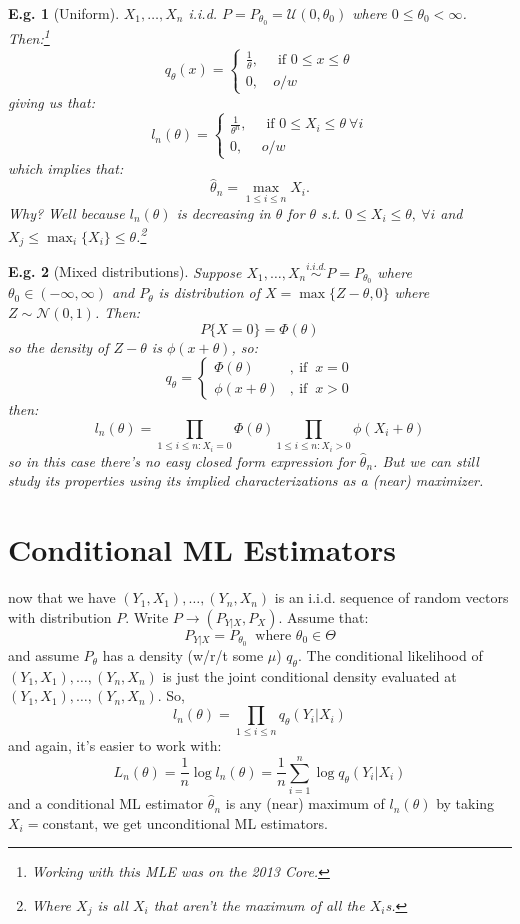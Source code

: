 \documentclass{tufte-book}
\theoremstyle{mytheoremstyle}
\theoremstyle{mylemstyle}
\theoremstyle{mydefstyle}
\newtheorem*{ex}{E.g.}
\begin{document}
\begin{ex}[Uniform] \(X_1, \dots, X_n\) i.i.d. \(P=P_{\theta_0} = \mathcal{U}(0, \theta_0)\) where \(0 \le \theta_0 < \infty\). Then:\footnote{Working with this MLE was on the 2013 Core.}
	\[q_\theta(x) = \begin{cases} \frac{1}{\theta},\ & \text{ if } 0 \le x \le \theta \\ 0,\ &o/w \end{cases} \]
giving us that:
	\[l_n(\theta) = \begin{cases} \frac{1}{\theta^n},\ & \text{ if } 0 \le X_i \le \theta\ \forall i \\ 0, & o/w \end{cases} \]
which implies that:
	\[\hat{\theta}_n = \max_{1 \le i \le n} X_i \text{.}\]
Why? Well because \(l_n(\theta)\) is decreasing in \(\theta\) for \(\theta\) s.t. \(0 \le X_i \le \theta,\ \forall i\) and \(X_j \le \max_i \{X_i\} \le \theta\).\footnote{Where \(X_j\) is all \(X_i\) that aren't the maximum of all the \(X_i\)s.}  
\end{ex}
\begin{ex}[Mixed distributions] Suppose \(X_1, \dots, X_n \overset{i.i.d.}{\sim} P=P_{\theta_0}\) where \(\theta_0 \in (-\infty, \infty)\) and \(P_\theta\) is distribution of \(X = \max\{Z-\theta, 0\}\) where \(Z \sim \mathcal{N}(0,1)\). Then:
	\[P\{X=0\} = \Phi(\theta)\]
so the density of \(Z- \theta\) is \(\phi(x+\theta)\), so:
	\[q_\theta = \begin{cases} \Phi(\theta)&,\ \text{if }\ x=0 \\ \phi(x + \theta)&,\ \text{if }\ x > 0 \end{cases}\]
then:
	\[l_n(\theta) = \prod_{1 \le i \le n: X_i = 0} \Phi(\theta) \prod_{1 \le i \le n: X_i > 0} \phi(X_i + \theta)\]
so in this case there's no easy closed form expression for \(\hat{\theta}_n\). But we can still study its properties using its implied characterizations as a (near) maximizer. 
\end{ex}

\section{Conditional ML Estimators}
 now that we have \((Y_1, X_1), \dots, (Y_n, X_n)\) is an i.i.d. sequence of random vectors with distribution \(P\). Write \(P \rightarrow (P_{Y|X}, P_X)\). Assume that:
	\[P_{Y|X} = P_{\theta_0}\ \text{ where } \theta_0 \in \Theta\]
and assume \(P_\theta\) has a density (w/r/t some \(\mu\)) \(q_\theta\). The conditional likelihood of \((Y_1, X_1), \dots, (Y_n, X_n)\) is just the joint conditional density evaluated at \((Y_1, X_1), \dots, (Y_n, X_n)\). So,
	\[l_n(\theta) = \prod_{1 \le i \le n} q_\theta(Y_i | X_i)\]
and again, it's easier to work with:
	\[L_n(\theta) = \frac{1}{n} \log l_n(\theta) = \frac{1}{n} \sum_{i=1}^n \log q_\theta (Y_i | X_i)\]
and a conditional ML estimator \(\hat{\theta}_n\) is any (near) maximum of \(l_n(\theta)\) by taking \(X_i=\)constant, we get unconditional ML estimators. 
\end{document}
